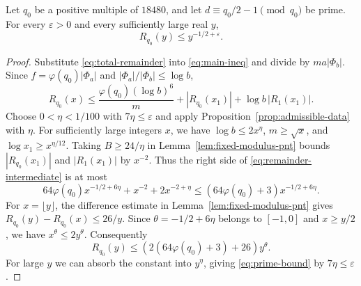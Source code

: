\begin{corollary}\label{cor:prime-bound}
Let \(q_0\) be a positive multiple of \(18480\), and let
\(d\equiv q_0/2-1\pmod{q_0}\) be prime.
For every \(\varepsilon>0\) and every sufficiently large real \(y\),
\begin{equation}\label{eq:prime-bound}
 R_{q_0}(y)\le y^{-1/2+\varepsilon}.
\end{equation}
\end{corollary}

\begin{proof}
Substitute \eqref{eq:total-remainder} into \eqref{eq:main-ineq} and
divide by \(ma|\Phi_b|\).
Since \(f=\varphi(q_0)|\Phi_a|\) and \(|\Phi_a|/|\Phi_b|\le\log b\),
\begin{equation}\label{eq:remainder-intermediate}
 R_{q_0}(x)
 \le\frac{\varphi(q_0)(\log b)^6}{m}
       +|R_{q_0}(x_1)|+\log b\,|R_1(x_1)|.
\end{equation}
Choose \(0<\eta<1/100\) with \(7\eta\le\varepsilon\) and apply
Proposition~\ref{prop:admissible-data} with \(\eta\).
For sufficiently large integers \(x\), we have
\(\log b\le2x^\eta\), \(m\ge\sqrt{x}\), and
\(\log x_1\ge x^{\eta/12}\).
Taking \(B\ge24/\eta\) in Lemma~\ref{lem:fixed-modulus-pnt} bounds
\(|R_{q_0}(x_1)|\) and \(|R_1(x_1)|\) by \(x^{-2}\).
Thus the right side of \eqref{eq:remainder-intermediate} is at most
\[
 64\varphi(q_0)x^{-1/2+6\eta}+x^{-2}+2x^{-2+\eta}
 \le (64\varphi(q_0)+3)x^{-1/2+6\eta}.
\]
For \(x=\lfloor y\rfloor\), the difference estimate in
Lemma~\ref{lem:fixed-modulus-pnt} gives \(R_{q_0}(y)-R_{q_0}(x)\le26/y\).
Since \(\theta=-1/2+6\eta\) belongs to \([-1,0]\) and \(x\ge y/2\),
we have \(x^\theta\le2y^\theta\). Consequently
\[
 R_{q_0}(y)\le (2(64\varphi(q_0)+3)+26)y^\theta .
\]
For large \(y\) we can absorb the constant into \(y^\eta\), giving
\eqref{eq:prime-bound} by \(7\eta\le\varepsilon\).
\end{proof}

